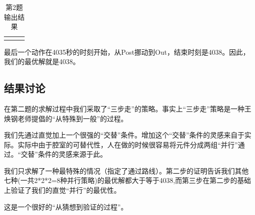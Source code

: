 \documentclass{ctexart}
\begin{document}
{{\begin{longtable}{clc}
            
            \bottomrule
            
            \caption{第2题输出结果}
        \end{longtable}

        最后一个动作在4035秒的时刻开始，从Post挪动到Out，结束时刻是4038。因此，我们的最优解就是4038。
    }
	
	\subsection{结果讨论}
	{
		在第二题的求解过程中我们采取了“三步走”的策略。事实上“三步走”策略是一种王焕钢老师提倡的“从特殊到一般”的过程。
		
		我们先通过直觉加上一个很强的“交替”条件。增加这个“交替”条件的灵感来自于实际。实际中由于腔室的可替代性，人在做的时候很容易将元件分成两组“并行”通过。“交替”条件的灵感来源于此。
		
		我们只求解了一种最特殊的情况（指定了通过路线）。第二步的证明告诉我们其他七种(一共2*2*2=8种并行策略)的最优解都大于等于4038,而第三步在第二步的基础上验证了我们的直觉“并行”的最优性。
		
		这是一个很好的“从猜想到验证的过程”。
	}

	

    \clearpage
}
\end{document}
